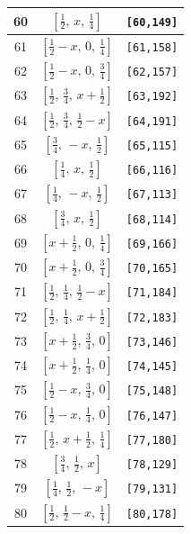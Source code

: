 \documentclass[fleqn,8pt]{jsarticle}
\begin{document}
\begin{longtable}{ccc}
60 & $\left[ \frac{1}{2},\, x,\, \frac{1}{4} \right]$ & {\tt [60,149]} \\ \hline
61 & $\left[ \frac{1}{2} - x,\, 0,\, \frac{1}{4} \right]$ & {\tt [61,158]} \\ \hline
62 & $\left[ \frac{1}{2} - x,\, 0,\, \frac{3}{4} \right]$ & {\tt [62,157]} \\ \hline
63 & $\left[ \frac{1}{2},\, \frac{3}{4},\, x + \frac{1}{2} \right]$ & {\tt [63,192]} \\ \hline
64 & $\left[ \frac{1}{2},\, \frac{3}{4},\, \frac{1}{2} - x \right]$ & {\tt [64,191]} \\ \hline
65 & $\left[ \frac{3}{4},\, - x,\, \frac{1}{2} \right]$ & {\tt [65,115]} \\ \hline
66 & $\left[ \frac{1}{4},\, x,\, \frac{1}{2} \right]$ & {\tt [66,116]} \\ \hline
67 & $\left[ \frac{1}{4},\, - x,\, \frac{1}{2} \right]$ & {\tt [67,113]} \\ \hline
68 & $\left[ \frac{3}{4},\, x,\, \frac{1}{2} \right]$ & {\tt [68,114]} \\ \hline
69 & $\left[ x + \frac{1}{2},\, 0,\, \frac{1}{4} \right]$ & {\tt [69,166]} \\ \hline
70 & $\left[ x + \frac{1}{2},\, 0,\, \frac{3}{4} \right]$ & {\tt [70,165]} \\ \hline
71 & $\left[ \frac{1}{2},\, \frac{1}{4},\, \frac{1}{2} - x \right]$ & {\tt [71,184]} \\ \hline
72 & $\left[ \frac{1}{2},\, \frac{1}{4},\, x + \frac{1}{2} \right]$ & {\tt [72,183]} \\ \hline
73 & $\left[ x + \frac{1}{2},\, \frac{3}{4},\, 0 \right]$ & {\tt [73,146]} \\ \hline
74 & $\left[ x + \frac{1}{2},\, \frac{1}{4},\, 0 \right]$ & {\tt [74,145]} \\ \hline
75 & $\left[ \frac{1}{2} - x,\, \frac{3}{4},\, 0 \right]$ & {\tt [75,148]} \\ \hline
76 & $\left[ \frac{1}{2} - x,\, \frac{1}{4},\, 0 \right]$ & {\tt [76,147]} \\ \hline
77 & $\left[ \frac{1}{2},\, x + \frac{1}{2},\, \frac{1}{4} \right]$ & {\tt [77,180]} \\ \hline
78 & $\left[ \frac{3}{4},\, \frac{1}{2},\, x \right]$ & {\tt [78,129]} \\ \hline
79 & $\left[ \frac{1}{4},\, \frac{1}{2},\, - x \right]$ & {\tt [79,131]} \\ \hline
80 & $\left[ \frac{1}{2},\, \frac{1}{2} - x,\, \frac{1}{4} \right]$ & {\tt [80,178]} \\ \hline

\end{longtable}
\end{document}
